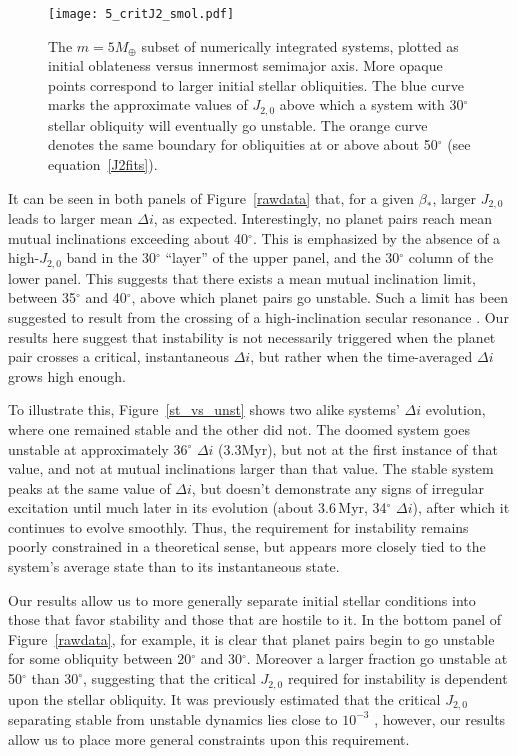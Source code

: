 \documentclass[twocolumn]{aastex63}
\begin{document}
\begin{figure}
\centering
\texttt{[image: 5\_critJ2\_smol.pdf]}
\caption{The \(m=5M_\oplus\) subset of numerically integrated systems, plotted as initial oblateness versus innermost semimajor axis. More opaque points correspond to larger initial stellar obliquities. The blue curve marks the approximate values of \(J_{2,0}\) above which a system with 30$^{\circ}$ stellar obliquity will eventually go unstable. The orange curve denotes the same boundary for obliquities at or above about 50$^{\circ}$ (see equation~\ref{J2fits}).}\label{critJ2}
\end{figure}

It can be seen in both panels of Figure~\ref{rawdata} that, for a given \(\beta_*\), larger \(J_{2,0}\) leads to larger mean \(\Delta i\), as expected. Interestingly, no planet pairs reach mean mutual inclinations exceeding about 40$^{\circ}$. This is emphasized by the absence of a high-\(J_{2,0}\) band in the 30$^{\circ}$ “layer” of the upper panel, and the 30$^{\circ}$ column of the lower panel. This suggests that there exists a mean mutual inclination limit, between 35$^{\circ}$ and 40$^{\circ}$, above which planet pairs go unstable. Such a limit has been suggested to result from the crossing of a high-inclination secular resonance \citep{spalding2018resilience}. Our results here suggest that instability is not necessarily triggered when the planet pair crosses a critical, instantaneous \(\Delta i\), but rather when the time-averaged $\Delta i$ grows high enough.

To illustrate this, Figure~\ref{st_vs_unst} shows two alike systems’ \(\Delta i\) evolution, where one remained stable and the other did not. The doomed system goes unstable at approximately 36$^{\circ}$ \(\Delta i\) (3.3Myr), but not at the first instance of that value, and not at mutual inclinations larger than that value. The stable system peaks at the same value of \(\Delta i\), but doesn't demonstrate any signs of irregular excitation until much later in its evolution (about 3.6\,Myr, 34$^{\circ}$ \(\Delta i\)), after which it continues to evolve smoothly. Thus, the requirement for instability remains poorly constrained in a theoretical sense, but appears more closely tied to the system's average state than to its instantaneous state.

Our results allow us to more generally separate initial stellar conditions into those that favor stability and those that are hostile to it. In the bottom panel of Figure~\ref{rawdata}, for example, it is clear that planet pairs begin to go unstable for some obliquity between 20$^{\circ}$ and 30$^{\circ}$. Moreover a larger fraction go unstable at 50$^{\circ}$ than $30^\circ$, suggesting that the critical $J_{2,0}$ required for instability is dependent upon the stellar obliquity. It was previously estimated that the critical \(J_{2,0}\) separating stable from unstable dynamics lies close to $10^{-3}$ \citep{spalding2018resilience}, however, our results allow us to place more general constraints upon this requirement.
\end{document}
